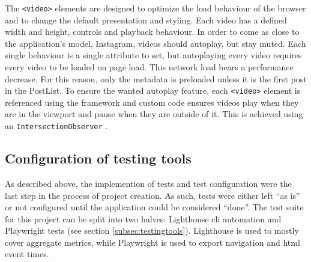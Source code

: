 \documentclass[a4paper, 12pt]{article}
\begin{document}
The \verb|<video>| elements are designed to optimize the load behaviour of the browser and to change the default presentation and styling.
Each video has a defined width and height, controls and playback behaviour.
In order to come as close to the application's model, Instagram, videos should autoplay, but stay muted.
Each single behaviour is a single attribute to set, but autoplaying every video requires every video to be loaded on page load.
This network load bears a performance decrease.
For this reason, only the metadata is preloaded unless it is the first post in the PostList.
To ensure the wanted autoplay feature, each \verb|<video>| element is referenced using the framework and custom code ensures videos play when they are in the viewport and pause when they are outside of it.
This is achieved using an \verb|IntersectionObserver| \citep{IntersectionObserver}.

\subsection{Configuration of testing tools}\label{subsec:tests}
% 

As described above, the implemention of tests and test configuration were the last step in the process of project creation.
As such, tests were either left \enquote{as is} or not configured until the application could be considered \enquote{done}.
The test suite for this project can be split into two halves: Lighthouse \acrshort{cli} automation and Playwright tests (see section \ref{subsec:testingtools}).
Lighthouse is used to mostly cover aggregate metrics, while Playwright is used to export navigation and \acrshort{html} event times.
\end{document}
